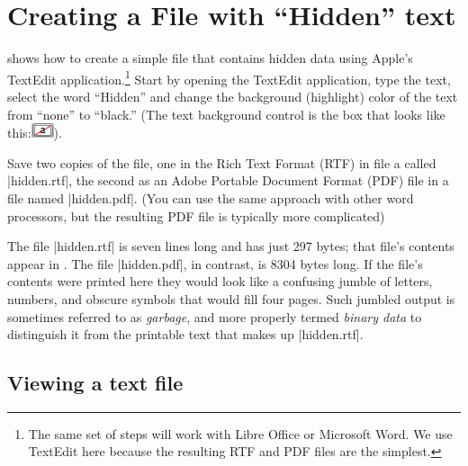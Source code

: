 \section{Creating a File with ``Hidden'' text}\label{sec:make-pdf}

 shows how to create a simple file that
contains hidden data using Apple's TextEdit application.\footnote{The
  same set of steps will work with Libre Office or Microsoft Word. We
  use TextEdit here because the resulting RTF and PDF files are the
  simplest.}
 Start by
opening the TextEdit application, type the text, select the word ``Hidden'' and
change the background (highlight) color of the text from ``none'' to
``black.'' (The text background control is the box that looks like this:\includegraphics[height=1.5ex]{ch-what/textedit_highlight_control}).

Save two copies of the file, one in the Rich Text Format (RTF) in file
a called |hidden.rtf|, the second as an Adobe Portable Document Format
(PDF) file in a file named |hidden.pdf|. (You can use
the same approach with other word processors, but the resulting PDF
file is typically more complicated) 



The file |hidden.rtf| is seven lines long and has just 297 bytes; that
file's contents appear in . The file |hidden.pdf|, in
contrast, is 8304 bytes long. If the file's contents were printed here
they would look like a confusing jumble of letters, numbers, and
obscure symbols that would fill four pages. Such jumbled output is 
sometimes referred to as \emph{garbage}, and more properly termed
\emph{binary data} to distinguish it from the printable text that
makes up |hidden.rtf|. 




\subsection{Viewing a text file}
